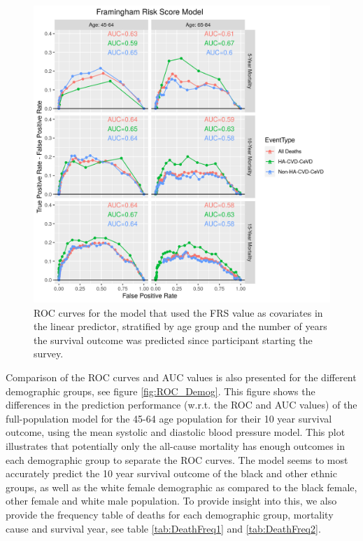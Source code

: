 \documentclass[
]{article}
\begin{document}
\begin{figure}
\hypertarget{fig:ROC_FRS}{%
\centering
\includegraphics{./Rmarkdown_Plots/ROC_FRSModel_CAx-EventType.png}
\caption{ROC curves for the model that used the FRS value as covariates in the linear predictor, stratified by age group and the number of years the survival outcome was predicted since participant starting the survey.}\label{fig:ROC_FRS}
}
\end{figure}

Comparison of the ROC curves and AUC values is also presented for the different demographic groups, see figure \ref{fig:ROC_Demog}. This figure shows the differences in the prediction performance (w.r.t. the ROC and AUC values) of the full-population model for the 45-64 age population for their 10 year survival outcome, using the mean systolic and diastolic blood pressure model. This plot illustrates that potentially only the all-cause mortality has enough outcomes in each demographic group to separate the ROC curves. The model seems to most accurately predict the 10 year survival outcome of the black and other ethnic groups, as well as the white female demographic as compared to the black female, other female and white male population. To provide insight into this, we also provide the frequency table of deaths for each demographic group, mortality cause and survival year, see table \ref{tab:DeathFreq1} and \ref{tab:DeathFreq2}.
\end{document}
